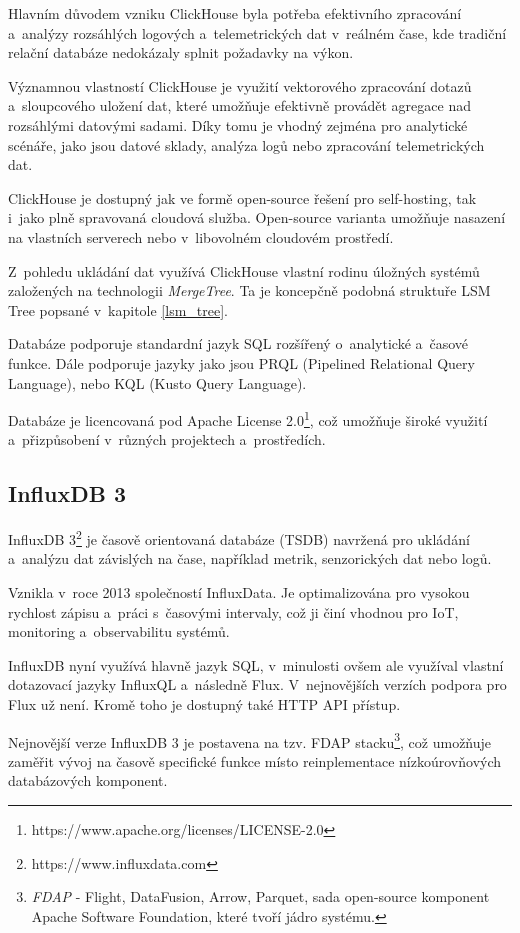 Hlavním důvodem vzniku ClickHouse byla potřeba efektivního zpracování a~analýzy rozsáhlých logových a~telemetrických dat v~reálném čase, kde tradiční relační databáze nedokázaly splnit požadavky na výkon.

Významnou vlastností ClickHouse je využití vektorového zpracování dotazů a~sloupcového uložení dat, které umožňuje efektivně provádět agregace nad rozsáhlými datovými sadami. 
Díky tomu je vhodný zejména pro analytické scénáře, jako jsou datové sklady, analýza logů nebo zpracování telemetrických dat.

ClickHouse je dostupný jak ve formě open-source řešení pro self-hosting, tak i~jako plně spravovaná cloudová služba. Open-source varianta umožňuje nasazení na vlastních serverech nebo v~libovolném cloudovém prostředí.

Z~pohledu ukládání dat využívá ClickHouse vlastní rodinu úložných systémů založených na technologii \textit{MergeTree}. 
Ta je koncepčně podobná struktuře LSM Tree popsané v~kapitole \ref{lsm_tree}. \cite{clickhousearchitecture}

Databáze podporuje standardní jazyk SQL rozšířený o~analytické a~časové funkce. Dále podporuje jazyky jako jsou PRQL (Pipelined Relational Query Language), nebo KQL (Kusto Query Language). \cite{clickhousearchitecture}

Databáze je licencovaná pod Apache License 2.0\footnote{https://www.apache.org/licenses/LICENSE-2.0}, což umožňuje široké využití a~přizpůsobení v~různých projektech a~prostředích.

\subsection{InfluxDB 3}

InfluxDB 3\footnote{https://www.influxdata.com} je časově orientovaná databáze (TSDB) navržená pro ukládání a~analýzu dat závislých na čase, například metrik, senzorických dat nebo logů.

Vznikla v~roce 2013 společností InfluxData.
Je optimalizována pro vysokou rychlost zápisu a~práci s~časovými intervaly, což ji činí vhodnou pro IoT, monitoring a~observabilitu systémů. 
\cite{influxdbdocs}

InfluxDB nyní využívá hlavně jazyk SQL, v~minulosti ovšem ale využíval vlastní dotazovací jazyky InfluxQL a~následně Flux. V~nejnovějších verzích podpora pro Flux už není.
Kromě toho je dostupný také HTTP API přístup. 
\cite{influxdbdocs}

Nejnovější verze InfluxDB 3 je postavena na tzv. FDAP stacku\footnote{\textit{FDAP} - Flight, DataFusion, Arrow, Parquet, sada open-source komponent Apache Software Foundation, které tvoří jádro systému.}, což umožňuje zaměřit vývoj na časově specifické funkce místo reinplementace nízkoúrovňových databázových komponent. \cite{influxdbdocs}


